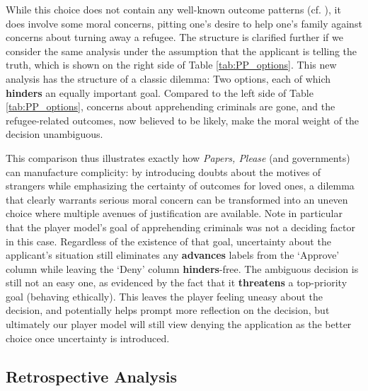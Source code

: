 \documentclass[arts,article,submit,moreauthors,pdftex,10pt,a4paper]{Definitions/mdpi}
\newcommand{\advances}{\textbf{\color{advances}advances}}
\newcommand{\threatens}{\textbf{\color{threatens}threatens}}
\newcommand{\hinders}{\textbf{\color{hinders}hinders}}
\begin{document}
While this choice does not contain any well-known outcome patterns (cf. \cite{mawhorter2014towards}), it does involve some moral concerns, pitting one's desire to help one's family against concerns about turning away a refugee.
%
The structure is clarified further if we consider the same analysis under the assumption that the applicant is telling the truth, which is shown on the right side of Table \ref{tab:PP_options}.
%
This new analysis has the structure of a classic dilemma: Two options, each of which \hinders{} an equally important goal.
%
Compared to the left side of Table \ref{tab:PP_options}, concerns about apprehending criminals are gone, and the refugee-related outcomes, now believed to be likely, make the moral weight of the decision unambiguous.


This comparison thus illustrates exactly how \emph{Papers, Please} (and governments) can manufacture complicity: by introducing doubts about the motives of strangers while emphasizing the certainty of outcomes for loved ones, a dilemma that clearly warrants serious moral concern can be transformed into an uneven choice where multiple avenues of justification are available.
%
Note in particular that the player model's goal of apprehending criminals was not a deciding factor in this case.
%
Regardless of the existence of that goal, uncertainty about the applicant's situation still eliminates any \advances{} labels from the `Approve' column while leaving the `Deny' column \hinders{}-free.
%
The ambiguous decision is still not an easy one, as evidenced by the fact that it \threatens{} a top-priority goal (behaving ethically).
%
This leaves the player feeling uneasy about the decision, and potentially helps prompt more reflection on the decision, but ultimately our player model will still view denying the application as the better choice once uncertainty is introduced.

\subsection{Retrospective Analysis}
\end{document}
